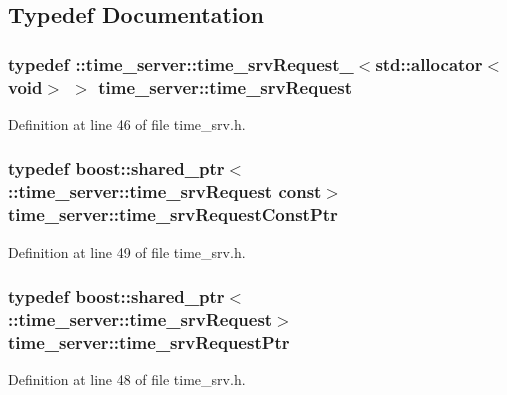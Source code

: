 \subsection{\-Typedef \-Documentation}
\subsubsection[{time\-\_\-srv\-Request}]{\setlength{\rightskip}{0pt plus 5cm}typedef \-::{\bf time\-\_\-server\-::time\-\_\-srv\-Request\-\_\-}$<$std\-::allocator$<$void$>$ $>$ {\bf time\-\_\-server\-::time\-\_\-srv\-Request}}\label{namespacetime__server_ab5e5cf8b2426abe5ebd061f8a8c014c5}


\-Definition at line 46 of file time\-\_\-srv.\-h.

\subsubsection[{time\-\_\-srv\-Request\-Const\-Ptr}]{\setlength{\rightskip}{0pt plus 5cm}typedef boost\-::shared\-\_\-ptr$<$ \-::{\bf time\-\_\-server\-::time\-\_\-srv\-Request} const$>$ {\bf time\-\_\-server\-::time\-\_\-srv\-Request\-Const\-Ptr}}\label{namespacetime__server_a316909eb9eea88461a984628c00d0e62}


\-Definition at line 49 of file time\-\_\-srv.\-h.

\subsubsection[{time\-\_\-srv\-Request\-Ptr}]{\setlength{\rightskip}{0pt plus 5cm}typedef boost\-::shared\-\_\-ptr$<$ \-::{\bf time\-\_\-server\-::time\-\_\-srv\-Request}$>$ {\bf time\-\_\-server\-::time\-\_\-srv\-Request\-Ptr}}\label{namespacetime__server_a43356222384a6655a7fef661f068642e}


\-Definition at line 48 of file time\-\_\-srv.\-h.

